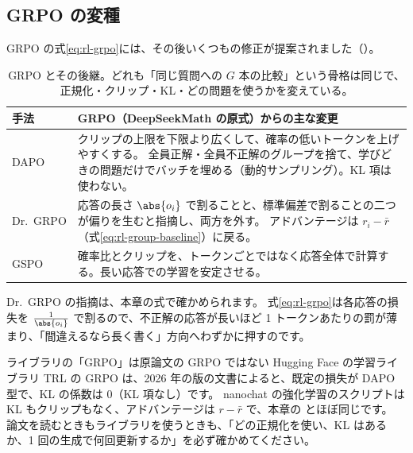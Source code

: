 \subsection{GRPO の変種}\label{sec:rl-variants-grpo}

GRPO の式\eqref{eq:rl-grpo}には、その後いくつもの修正が提案されました（）。

\begin{table}[tbp]
\centering
\caption{GRPO とその後継。どれも「同じ質問への $G$ 本の比較」という骨格は同じで、正規化・クリップ・KL・どの問題を使うかを変えている。}
\label{tab:rl-variants}
\small
\begin{tabular}{p{27mm}p{93mm}}
\toprule
手法 & GRPO（DeepSeekMath の原式）からの主な変更 \\
\midrule
DAPO\cite{yu2025dapo} & クリップの上限を下限より広くして、確率の低いトークンを上げやすくする。
全員正解・全員不正解のグループを捨て、学びどきの問題だけでバッチを埋める（動的サンプリング）。KL 項は使わない。 \\
Dr.\ GRPO\cite{liu2025understanding} & 応答の長さ $\abs{o_i}$ で割ることと、標準偏差で割ることの二つが偏りを生むと指摘し、両方を外す。
アドバンテージは $r_i-\bar r$（式\eqref{eq:rl-group-baseline}）に戻る。 \\
GSPO\cite{zheng2025gspo} & 確率比とクリップを、トークンごとではなく応答全体で計算する。長い応答での学習を安定させる。 \\
\bottomrule
\end{tabular}
\end{table}

Dr.\ GRPO の指摘は、本章の式で確かめられます。
式\eqref{eq:rl-grpo}は各応答の損失を $\frac{1}{\abs{o_i}}$ で割るので、不正解の応答が長いほど 1 トークンあたりの罰が薄まり、「間違えるなら長く書く」方向へわずかに押すのです。

\begin{practice}{ライブラリの「GRPO」は原論文の GRPO ではない}
Hugging Face の学習ライブラリ TRL の GRPO は、2026 年の版の文書によると、既定の損失が DAPO 型で、KL の係数は 0（KL 項なし）です。
nanochat の強化学習のスクリプト\cite{karpathy2025nanochat}は KL もクリップもなく、アドバンテージは $r-\bar r$ で、本章の  とほぼ同じです。
論文を読むときもライブラリを使うときも、「どの正規化を使い、KL はあるか、1 回の生成で何回更新するか」を必ず確かめてください。
\end{practice}

